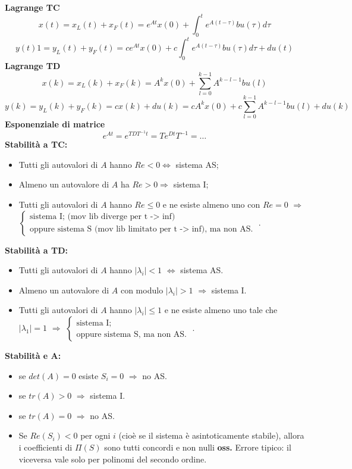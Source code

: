 \textbf{Lagrange TC}
\[
    x(t) = x_L(t) + x_F(t) =e^{At} x(0) + \int_{0}^{t}e^{A(t-\tau)}bu(\tau)d \tau
\]
\[
    y(t) 1 = y_L(t) + y_F(t) = ce^{At}x(0) + c \int_{0}^{t}e^{A(t-\tau)}bu(\tau)d \tau + du(t)
\]
\textbf{Lagrange TD}
\[
    x(k)= x_L(k) + x_F(k) =A^k x(0) + \sum_{l=0}^{k-1}A^{k-l-1}bu(l)
\]
\[
    y(k) = y_L(k) + y_F(k) = cx(k)+du(k) =cA^k x(0) + c\sum_{l=0}^{k-1}A^{k-l-1}bu(l) + du(k)
\]
\textbf{Esponenziale di matrice}
\[
    e^{At} = e^{TDT^{-1} t} = T e^{Dt} T^{-1} = \dots
\]
\textbf{Stabilità a TC:}
\begin{itemize}
    \item Tutti gli autovalori di $A$ hanno $Re < 0 \Longleftrightarrow $ sistema AS;
    \item Almeno un autovalore di $A$ ha $Re > 0 \Longrightarrow$ sistema I;
    \item Tutti gli autovalori di $A$ hanno $Re \leq 0$ e ne esiste almeno uno con $Re = 0$ $\Longrightarrow$ $\begin{cases}
        \text{sistema I; (mov lib diverge per t -> inf)}\;\\
        \text{oppure sistema S (mov lib limitato per t -> inf), ma non AS.}\;
    \end{cases}$.
\end{itemize}
\textbf{Stabilità a TD:}
\begin{itemize}
    \item Tutti gli autovalori di $A$ hanno $|\lambda_i| < 1$ $\Longleftrightarrow$ sistema AS.
    \item Almeno un autovalore di $A$ con modulo $|\lambda_i| > 1$ $\Longrightarrow$ sistema I.
    \item Tutti gli autovalori di $A$ hanno $|\lambda_i| \leq 1$ e ne esiste almeno uno tale che $|\lambda_1| = 1$ $\Longrightarrow$ $\begin{cases}
        \text{sistema I;}\;\\
        \text{oppure sistema S, ma non AS.}\;
    \end{cases}$.
\end{itemize}
\textbf{Stabilità e A:}
\begin{itemize}
    \item se $det(A) = 0$ esiste $S_i = 0$ $\Longrightarrow$ no AS.
    \item se $tr(A) >0$ $\Longrightarrow$ sistema I.
    \item se $tr(A) = 0$ $\Longrightarrow$ no AS.
    \item Se $Re(S_i)<0$ per ogni $i$ (cioè se il sistema è asintoticamente stabile), allora i coefficienti di $\Pi(S)$ sono tutti concordi e non nulli \newline
    \textbf{oss.} Errore tipico: il viceversa vale solo per polinomi del secondo ordine.
\end{itemize}
